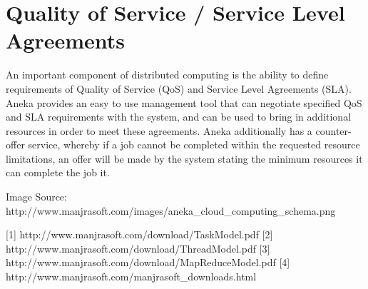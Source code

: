 \section{Quality of Service / Service Level Agreements}
An important component of distributed computing is the ability to define requirements of Quality of Service (QoS) and Service Level Agreements (SLA)\cite{CloudBus}. Aneka provides an easy to use management tool that can negotiate specified QoS and SLA requirements with the system, and can be used to bring in additional resources in order to meet these agreements. Aneka additionally has a counter-offer service, whereby if a job cannot be completed within the requested resource limitations, an offer will be made by the system stating the minimum resources it can complete the job it.


Image Source: http://www.manjrasoft.com/images/aneka\_cloud\_computing\_schema.png

[1] http://www.manjrasoft.com/download/TaskModel.pdf
[2] http://www.manjrasoft.com/download/ThreadModel.pdf
[3] http://www.manjrasoft.com/download/MapReduceModel.pdf
[4] http://www.manjrasoft.com/manjrasoft\_downloads.html
